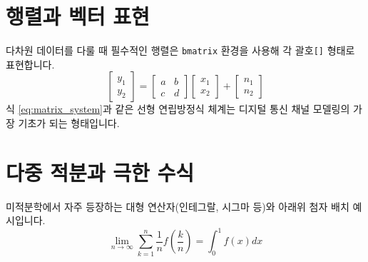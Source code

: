 \documentclass[12pt,a4paper,oneside]{memoir}
\begin{document}
\section{행렬과 벡터 표현}
다차원 데이터를 다룰 때 필수적인 행렬은 \texttt{bmatrix} 환경을 사용해 각 괄호\texttt{[]} 형태로 표현합니다.
\begin{equation}
    \begin{bmatrix}
        y_1 \\
        y_2
    \end{bmatrix} = 
    \begin{bmatrix}
        a & b \\
        c & d
    \end{bmatrix}
    \begin{bmatrix}
        x_1 \\
        x_2
    \end{bmatrix} + 
    \begin{bmatrix}
        n_1 \\
        n_2
    \end{bmatrix} \label{eq:matrix_system}
\end{equation}
식 \ref{eq:matrix_system}과 같은 선형 연립방정식 체계는 디지털 통신 채널 모델링의 가장 기초가 되는 형태입니다.

\section{다중 적분과 극한 수식}
미적분학에서 자주 등장하는 대형 연산자(인테그랄, 시그마 등)와 아래위 첨자 배치 예시입니다.
\begin{equation}
    \lim_{n \to \infty} \sum_{k=1}^{n} \frac{1}{n} f\left(\frac{k}{n}\right) = \int_{0}^{1} f(x) dx
\end{equation}
\end{document}
